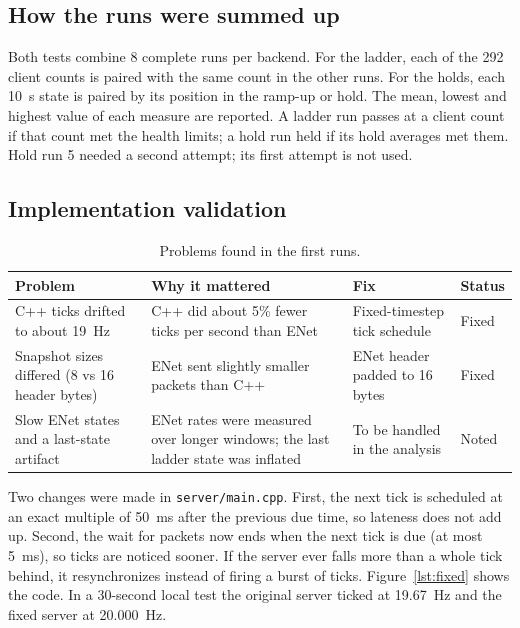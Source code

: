 \documentclass[11pt]{article}
\begin{document}
\subsection{How the runs were summed up}
Both tests combine 8 complete runs per backend. For the ladder, each of the 292 client counts is paired with the same count in the other runs. For the holds, each 10~s state is paired by its position in the ramp-up or hold. The mean, lowest and highest value of each measure are reported. A ladder run passes at a client count if that count met the health limits; a hold run held if its hold averages met them. Hold run 5 needed a second attempt; its first attempt is not used.

\subsection{Implementation validation}\label{sec:fixes}
\begin{table}[H]
\centering
\footnotesize
\setlength{\tabcolsep}{3pt}
\begin{tabular}{>{\raggedright\arraybackslash}p{}>{\raggedright\arraybackslash}p{}>{\raggedright\arraybackslash}p{}>{\raggedright\arraybackslash}p{}}
\toprule
Problem & Why it mattered & Fix & Status \\
\midrule
C++ ticks drifted to about 19~Hz & C++ did about 5\% fewer ticks per second than ENet & Fixed-timestep tick schedule & Fixed \\
Snapshot sizes differed (8 vs 16 header bytes) & ENet sent slightly smaller packets than C++ & ENet header padded to 16 bytes & Fixed \\
Slow ENet states and a last-state artifact & ENet rates were measured over longer windows; the last ladder state was inflated & To be handled in the analysis & Noted \\
\bottomrule
\end{tabular}
\caption{Problems found in the first runs.}
\label{tab:problems}
\end{table}

Two changes were made in \texttt{server/main.cpp}. First, the next tick is scheduled at an exact multiple of 50~ms after the previous due time, so lateness does not add up. Second, the wait for packets now ends when the next tick is due (at most 5~ms), so ticks are noticed sooner. If the server ever falls more than a whole tick behind, it resynchronizes instead of firing a burst of ticks. Figure~\ref{lst:fixed} shows the code. In a 30-second local test the original server ticked at 19.67~Hz and the fixed server at 20.000~Hz.
\end{document}
